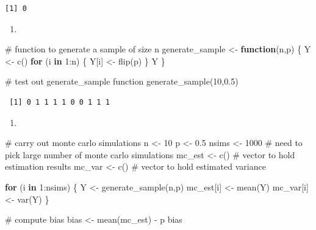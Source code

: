\documentclass[
  letterpaper,
  DIV=11,
  numbers=noendperiod]{scrreprt}
\newenvironment{Shaded}{\begin{snugshade}}{\end{snugshade}}
\newcommand{\CommentTok}[1]{\textcolor[rgb]{0.37,0.37,0.37}{#1}}
\newcommand{\ControlFlowTok}[1]{\textcolor[rgb]{0.00,0.23,0.31}{\textbf{#1}}}
\newcommand{\DecValTok}[1]{\textcolor[rgb]{0.68,0.00,0.00}{#1}}
\newcommand{\FloatTok}[1]{\textcolor[rgb]{0.68,0.00,0.00}{#1}}
\newcommand{\FunctionTok}[1]{\textcolor[rgb]{0.28,0.35,0.67}{#1}}
\newcommand{\NormalTok}[1]{\textcolor[rgb]{0.00,0.23,0.31}{#1}}
\newcommand{\OtherTok}[1]{\textcolor[rgb]{0.00,0.23,0.31}{#1}}
\newcommand{\SpecialCharTok}[1]{\textcolor[rgb]{0.37,0.37,0.37}{#1}}
\providecommand{\tightlist}{%
  \setlength{\itemsep}{0pt}\setlength{\parskip}{0pt}}\usepackage{longtable,booktabs,array}
\begin{document}
\begin{verbatim}
[1] 0
\end{verbatim}

\begin{enumerate}
\def\labelenumi{\arabic{enumi}.}
\setcounter{enumi}{1}
\tightlist
\item
\end{enumerate}

\begin{Shaded}
\begin{Highlighting}[]
\CommentTok{\# function to generate a sample of size n}
\NormalTok{generate\_sample }\OtherTok{\textless{}{-}} \ControlFlowTok{function}\NormalTok{(n,p) \{}
\NormalTok{  Y }\OtherTok{\textless{}{-}} \FunctionTok{c}\NormalTok{()}
  \ControlFlowTok{for}\NormalTok{ (i }\ControlFlowTok{in} \DecValTok{1}\SpecialCharTok{:}\NormalTok{n) \{}
\NormalTok{    Y[i] }\OtherTok{\textless{}{-}} \FunctionTok{flip}\NormalTok{(p)}
\NormalTok{  \}}
\NormalTok{  Y}
\NormalTok{\}}

\CommentTok{\# test out generate\_sample function}
\FunctionTok{generate\_sample}\NormalTok{(}\DecValTok{10}\NormalTok{,}\FloatTok{0.5}\NormalTok{)}
\end{Highlighting}
\end{Shaded}

\begin{verbatim}
 [1] 0 1 1 1 1 0 0 1 1 1
\end{verbatim}

\begin{enumerate}
\def\labelenumi{\arabic{enumi}.}
\setcounter{enumi}{2}
\tightlist
\item
\end{enumerate}

\begin{Shaded}
\begin{Highlighting}[]
\CommentTok{\# carry out monte carlo simulations}
\NormalTok{n }\OtherTok{\textless{}{-}} \DecValTok{10}
\NormalTok{p }\OtherTok{\textless{}{-}} \FloatTok{0.5}
\NormalTok{nsims }\OtherTok{\textless{}{-}} \DecValTok{1000}  \CommentTok{\# need to pick large number of monte carlo simulations}
\NormalTok{mc\_est }\OtherTok{\textless{}{-}} \FunctionTok{c}\NormalTok{()  }\CommentTok{\# vector to hold estimation results}
\NormalTok{mc\_var }\OtherTok{\textless{}{-}} \FunctionTok{c}\NormalTok{()  }\CommentTok{\# vector to hold estimated variance}

\ControlFlowTok{for}\NormalTok{ (i }\ControlFlowTok{in} \DecValTok{1}\SpecialCharTok{:}\NormalTok{nsims) \{}
\NormalTok{  Y }\OtherTok{\textless{}{-}} \FunctionTok{generate\_sample}\NormalTok{(n,p)}
\NormalTok{  mc\_est[i] }\OtherTok{\textless{}{-}} \FunctionTok{mean}\NormalTok{(Y)}
\NormalTok{  mc\_var[i] }\OtherTok{\textless{}{-}} \FunctionTok{var}\NormalTok{(Y)}
\NormalTok{\}}

\CommentTok{\# compute bias}
\NormalTok{bias }\OtherTok{\textless{}{-}} \FunctionTok{mean}\NormalTok{(mc\_est) }\SpecialCharTok{{-}}\NormalTok{ p}
\NormalTok{bias}
\end{Highlighting}
\end{Shaded}
\end{document}
